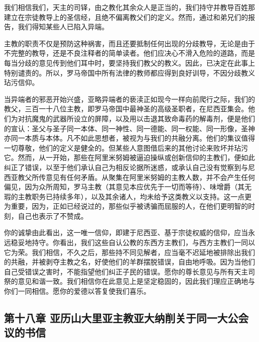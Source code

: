 我们相信我们，天主的司铎，由之教化其余众人是正当的，我们持守并教导百姓那建立在宗徒教导上的圣信经，且绝不偏离教父们的定义。然而，通过和弟兄们的报告，我们得知某些人已陷入异端。\par

主教的职责不仅是预防这种祸害，而且还要抵制任何出现的分歧教导，无论是由于不完整的教导，还是不良注释者的简单读者。他们应决心不滑入危险的道路，而是每当分歧的意见传到他们耳中时，要坚持我们教父的教义。因此，已决定在此事上特别谴责的。所以，罗马帝国中所有法律的教师都应得到良好训导，不因分歧教义玷污信仰。\par

当异端者的邪恶开始兴盛，亚略异端者的亵渎正如现今一样向前爬行之际，我们的教父，三百一十八位主教，即罗马帝国中最神圣的高级圣职者，在尼西亚集会。他们为对抗魔鬼的武器所设立的屏障，以及用以击退其致命毒药的解毒剂，便是他们的宣认：圣父与圣子同一本体、同一神性、同一德能、同一权能、同一形像，圣神亦同一本质与本体。凡不如此思想者，被视为与我们的共融分离。他们的集议值得一切尊敬，他们的定义是健全的。但某些人意图借后来的其他讨论来败坏并玷污它。然而，从一开始，那些在阿里米努姆被逼迫操纵或创新信仰的主教们，便如此纠正了错误，以至于他们承认自己为相反论据所迷惑，或承认自己没有觉察到与尼西亚教父所传意见有任何矛盾。从聚集在阿里米努姆的主教人数，并不会产生任何偏见，因为众所周知，罗马主教（其意见本应优先于一切而等待）、味增爵（其无瑕的主教职务已持续多年），以及其余诸人，均未给予这类教义以支持。这一点更为重要，因为，正如已经说过的，那些似乎被诱骗而屈服的人，在他们更明智的时刻，自己也表示了不赞成。\par

你的诚挚由此看出，这一唯一信仰，即建于尼西亚、基于宗徒权威的信仰，应当永远稳妥地持守。你看出，我们这些自认公教的东西方主教们，与西方主教们一同以它为荣。我们相信，不久之后，那些持不同见解者，应当毫不迟延地被排除出我们的共融，并被剥夺主教之名，好使他们的羊群摆脱错误，自由地呼吸。因为当他们自己受错误之害时，不能指望他们纠正子民的错误。愿你的尊长意见与所有天主司祭的意见和谐一致。我们相信你在此意见上是坚定稳固的，因此我们理应正确地与你们一同相信。愿你的爱德以答复使我们喜乐。\par

\par


\subsection{第十八章 亚历山大里亚主教亚大纳削关于同一大公会议的书信}

